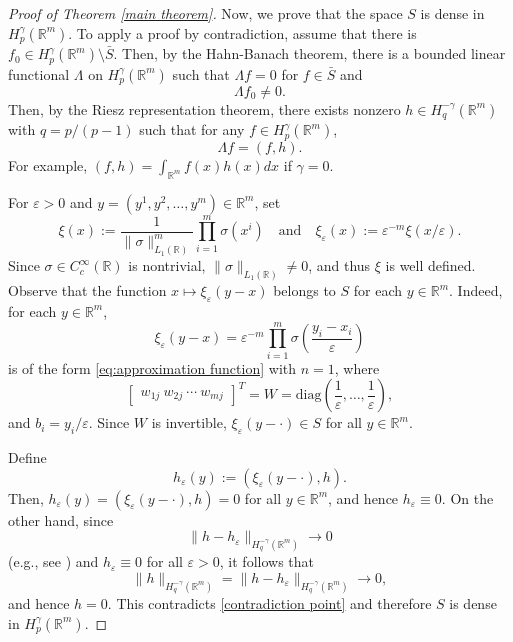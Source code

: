\documentclass[10pt,a4paper]{amsart}
\newcommand\bR{\mathbb{R}}
\newcommand\ep{\varepsilon}
\begin{document}
\begin{proof}[Proof of Theorem \ref{main theorem}]
Now, we prove that the space $S$ is dense in $H_p^\gamma(\bR^{m})$. To apply a proof by contradiction, assume that there is $f_0\in H_p^\gamma(\bR^{m})\setminus \bar S$. Then, by the Hahn-Banach theorem, there is a bounded linear functional $\Lambda$ on $H_p^\gamma(\bR^{m})$ such that $\Lambda f = 0$ for $f\in \bar S$ and 
\begin{equation}
\label{contradiction point}
\Lambda f_0\neq 0.
\end{equation}
Then, by the Riesz representation theorem, there exists nonzero $h\in H_q^{-\gamma}(\bR^{m})$ with $q = p/(p-1)$ such that for any $f\in H_p^\gamma(\bR^{m})$,
\begin{equation*}
\Lambda f = (f,h).
\end{equation*}
For example, $(f,h) = \int_{\bR^{m}} f(x)h(x) dx$ if $\gamma = 0$.


For $\ep>0$ and $y = (y^{1},y^{2},\dots,y^{m})\in\bR^{m}$, set
\begin{equation}
\label{mollifier}
\xi (x) := \frac{1}{\| \sigma \|_{L_1(\bR)}^{m}}\prod_{i = 1}^{m}\sigma(x^{i})\quad\text{and}\quad 
\xi_{\ep}(x) := \ep^{-m}\xi\left( x/\ep \right).
\end{equation}
Since $\sigma\in C_c^\infty(\bR)$ is nontrivial, $\| \sigma \|_{L_{1}(\bR)}\neq 0$, and thus $\xi$ is well defined. 
Observe that the function
$x\mapsto \xi_\varepsilon(y-x)$ belongs to $S$ for each $y\in\mathbb{R}^m$. Indeed, for each $y\in\mathbb{R}^m$,
\[
\xi_\varepsilon(y-x)
=\varepsilon^{-m}\prod_{i=1}^m \sigma\!\left(\frac{y_i-x_i}{\varepsilon}\right)
\]
is of the form \eqref{eq:approximation function} with $n=1$, where 
\[
\begin{bmatrix}
w_{1j}~w_{2j}~\cdots~w_{mj}
\end{bmatrix}^{T} = W =\mathrm{diag}\!\left(\frac1\varepsilon,\dots,\frac1\varepsilon\right),
\]
and $b_i=y_i/\varepsilon$. Since $W$ is invertible, $\xi_\varepsilon(y-\cdot)\in S$ for all $y\in\mathbb{R}^m$.


Define
\begin{equation*}
h_{\ep}(y) 
:= \left(\xi_{\ep}(y - \cdot),h\right).
\end{equation*}
Then, $h_\varepsilon(y)
=(\xi_\varepsilon(y-\cdot),h)=0$ for all $y\in\mathbb{R}^m$,
and hence $h_\varepsilon\equiv0$.
On the other hand, since 
\begin{equation}
\label{mollification}
\|h-h_\varepsilon\|_{H_q^{-\gamma}(\mathbb{R}^m)} \to 0
\end{equation}
(e.g., see \cite[Theorem 13.9.2]{krylov2024lectures}) and $h_\varepsilon\equiv0$ for all $\varepsilon>0$, it follows that
\[
\|h\|_{H_q^{-\gamma}(\mathbb{R}^m)}=\|h-h_\varepsilon\|_{H_q^{-\gamma}(\mathbb{R}^m)}\to0,
\]
and hence $h=0$.
This contradicts \eqref{contradiction point} and therefore $S$ is dense in
$H_p^\gamma(\mathbb{R}^m)$.



\end{proof}
\end{document}

